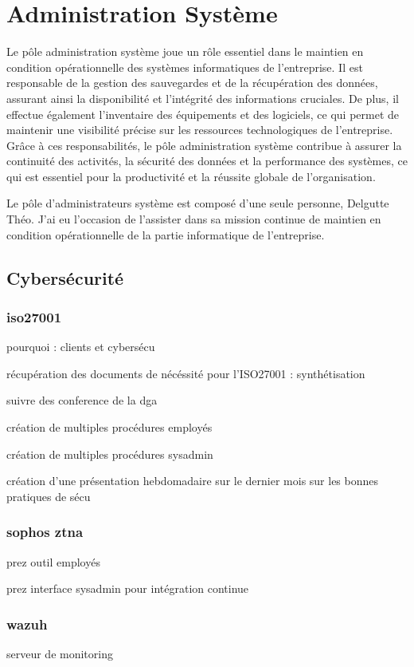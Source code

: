 \section{Administration Système}
Le pôle administration système joue un rôle essentiel dans le maintien en condition opérationnelle des systèmes informatiques de l'entreprise.
Il est responsable de la gestion des sauvegardes et de la récupération des données, assurant ainsi la disponibilité et l'intégrité des informations cruciales.
De plus, il effectue également l'inventaire des équipements et des logiciels, ce qui permet de maintenir une visibilité précise sur les ressources technologiques de l'entreprise.
Grâce à ces responsabilités, le pôle administration système contribue à assurer la continuité des activités, la sécurité des données et la performance des systèmes, ce qui est essentiel pour la productivité et la réussite globale de l'organisation.

Le pôle d'administrateurs système est composé d'une seule personne, Delgutte Théo.
J'ai eu l'occasion de l'assister dans sa mission continue de maintien en condition opérationnelle de la partie informatique de l'entreprise.

\subsection{Cybersécurité}
\subsubsection{iso27001}
pourquoi : clients et cybersécu

récupération des documents de nécéssité pour l'ISO27001 : synthétisation

suivre des conference de la dga

création de multiples procédures employés

création de multiples procédures sysadmin

création d'une présentation hebdomadaire sur le dernier mois sur les bonnes pratiques de sécu

\subsubsection{sophos ztna}
prez outil employés

prez interface sysadmin pour intégration continue   

\subsubsection{wazuh}
serveur de monitoring


